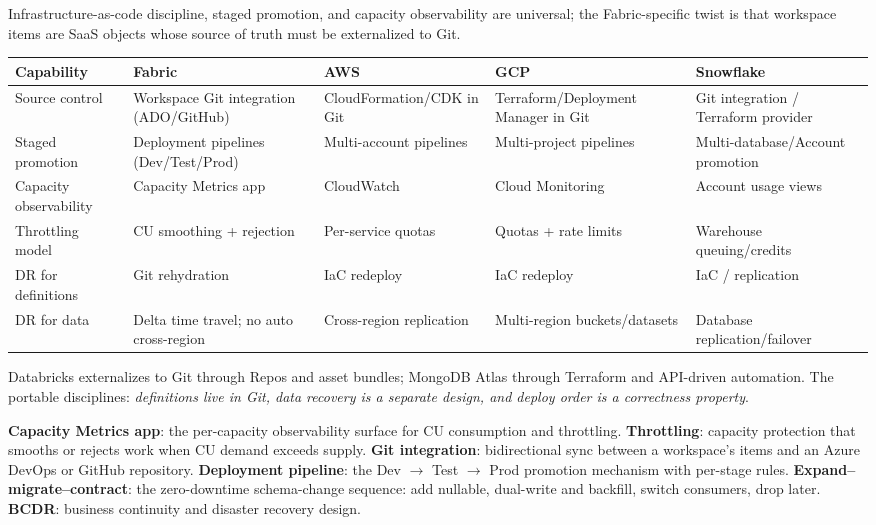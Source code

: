 \begin{crosscloud}
Infrastructure-as-code discipline, staged promotion, and capacity observability are universal; the Fabric-specific twist is that workspace items are SaaS objects whose source of truth must be externalized to Git.

\vspace{2mm}
{\footnotesize
\begin{tabular}{@{}p{2.8cm}p{3.2cm}p{3.2cm}p{3.2cm}p{3.2cm}@{}}
\toprule
\textbf{Capability} & \textbf{Fabric} & \textbf{AWS} & \textbf{GCP} & \textbf{Snowflake} \\
\midrule
Source control & Workspace Git integration (ADO/GitHub) & CloudFormation/CDK in Git & Terraform/Deployment Manager in Git & Git integration / Terraform provider \\
Staged promotion & Deployment pipelines (Dev/Test/Prod) & Multi-account pipelines & Multi-project pipelines & Multi-database/Account promotion \\
Capacity observability & Capacity Metrics app & CloudWatch & Cloud Monitoring & Account usage views \\
Throttling model & CU smoothing + rejection & Per-service quotas & Quotas + rate limits & Warehouse queuing/credits \\
DR for definitions & Git rehydration & IaC redeploy & IaC redeploy & IaC / replication \\
DR for data & Delta time travel; no auto cross-region & Cross-region replication & Multi-region buckets/datasets & Database replication/failover \\
\bottomrule
\end{tabular}}

\vspace{1mm}
Databricks externalizes to Git through Repos and asset bundles; MongoDB Atlas through Terraform and API-driven automation. The portable disciplines: \emph{definitions live in Git, data recovery is a separate design, and deploy order is a correctness property}.
\end{crosscloud}

\begin{keyterms}
\textbf{Capacity Metrics app}: the per-capacity observability surface for CU consumption and throttling. \quad
\textbf{Throttling}: capacity protection that smooths or rejects work when CU demand exceeds supply. \quad
\textbf{Git integration}: bidirectional sync between a workspace's items and an Azure DevOps or GitHub repository. \quad
\textbf{Deployment pipeline}: the Dev $\rightarrow$ Test $\rightarrow$ Prod promotion mechanism with per-stage rules. \quad
\textbf{Expand--migrate--contract}: the zero-downtime schema-change sequence: add nullable, dual-write and backfill, switch consumers, drop later. \quad
\textbf{BCDR}: business continuity and disaster recovery design.
\end{keyterms}

